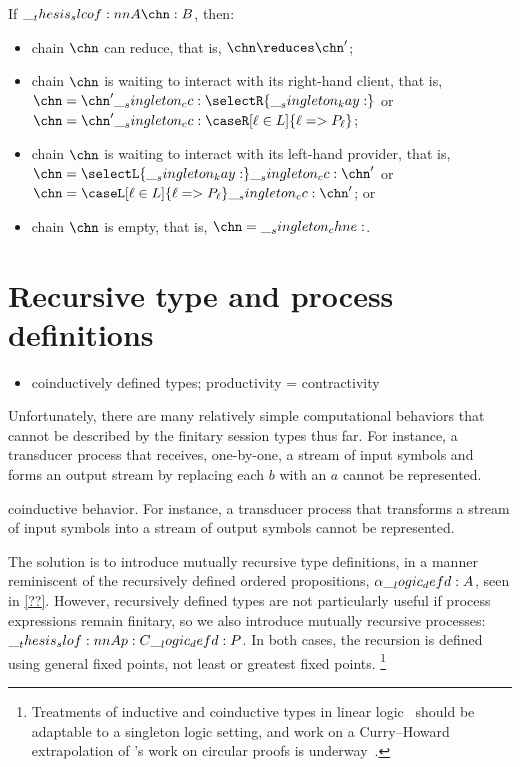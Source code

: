 \begin{theorem}[Progress]
  If $\slcof{A |- \chn : B}$, then:
  \begin{itemize}
  \item chain $\chn$ can reduce, that is, $\chn \reduces \chn'$;
  \item chain $\chn$ is waiting to interact with its right-hand client, that is, $\chn = \chn' \cc \selectR{\kay}$ or $\chn = \chn' \cc \caseR[\ell \in L]{\ell => P_{\ell}}$;
  \item chain $\chn$ is waiting to interact with its left-hand provider, that is, $\chn = \selectL{\kay} \cc \chn'$ or $\chn = \caseL[\ell \in L]{\ell => P_{\ell}} \cc \chn'$; or
  \item chain $\chn$ is empty, that is, $\chn = \chne$.
  \end{itemize}
\end{theorem}


\section{Recursive type and process definitions}

\begin{itemize}
\item coinductively defined types; productivity = contractivity
\end{itemize}

Unfortunately, there are many relatively simple computational behaviors that cannot be described by the finitary session types thus far.
For instance, a transducer process that receives, one-by-one, a stream of input symbols and forms an output stream by replacing each $b$ with an $a$ cannot be represented.

coinductive behavior.
For instance, a transducer process that transforms a stream of input symbols into a stream of output symbols cannot be represented.

The solution is to introduce mutually recursive type definitions, in a manner reminiscent of the recursively defined ordered propositions, $\alpha \__logic_defd: A$, seen in \cref{??}.
However, recursively defined types are not particularly useful if process expressions remain finitary, so we also introduce mutually recursive processes: $\slof{A |- p : C} \defd P$.
In both cases, the recursion is defined using general fixed points, not least or greatest fixed points.%
\footnote{Treatments of inductive and coinductive types in linear logic~\parencite{Baelde:TCL12,Toninho+:TGC14} should be adaptable to a singleton logic setting, and work on a Curry--Howard extrapolation of \citeauthor{Fortier+Santocanale:CSL13}'s work on circular proofs\textcite*{Fortier+Santocanale:CSL13} is underway~\parencite{Derakhshan+Pfenning:CMU19}.}


